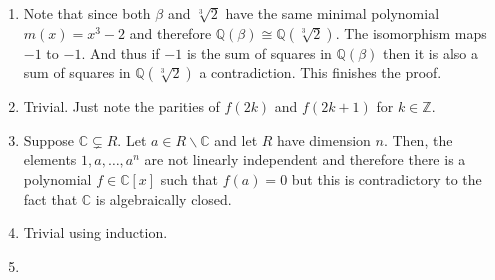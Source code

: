 \documentclass[12pt]{article}
\newcommand{\Q}{\mathbb{Q}}
\newcommand{\Z}{\mathbb{Z}}
\newcommand{\setItemnumber}[1]{\setcounter{enumi}{\numexpr#1-1\relax}}
\begin{document}
\begin{enumerate}
    \setItemnumber{11}
    \item Note that since both $\beta$ and $\sqrt[3]{2}$ have the same minimal polynomial $m(x) = x^3 - 2$ and therefore $\Q(\beta)\cong\Q(\sqrt[3]{2})$. The isomorphism maps $-1$ to $-1$. And thus if $-1$ is the sum of squares in $\Q(\beta)$ then it is also a sum of squares in $\Q(\sqrt[3]{2})$ a contradiction. This finishes the proof.

    \item Trivial. Just note the parities of $f(2k)$ and $f(2k + 1)$ for $k\in\Z$.


    \item Suppose $\mathbb{C}\subsetneq R$. Let $a\in R\backslash\mathbb{C}$ and let $R$ have dimension $n$. Then, the elements $1,a,\ldots,a^n$ are not linearly independent and therefore there is a polynomial $f\in\mathbb{C}[x]$ such that $f(a) = 0$ but this is contradictory to the fact that $\mathbb{C}$ is algebraically closed.

    \setItemnumber{29}
    \item Trivial using induction.

    \item 
\end{enumerate}
\end{document}
